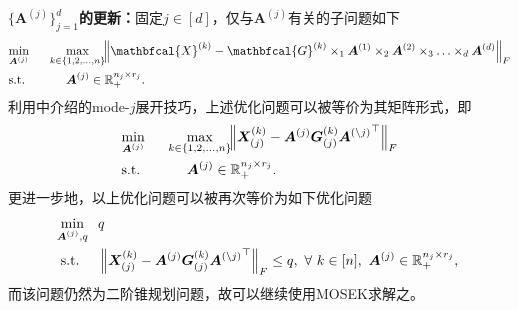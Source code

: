 \textbf{$\{\boldsymbol{A}^{(j)}\}_{j=1}^{d}$的更新：}固定$j\in[d]$，仅与$\boldsymbol{A}^{(j)}$有关的子问题如下
\begin{equation*}
\begin{aligned}
    &\underset{\boldsymbol{A}^{(j)}}{\min}\qquad&& \underset{\mathclap{k\in\{1,2,\ldots,n\}}}{\max}\quad \left\|\mathbfcal{X}^{(k)}-\mathbfcal{G}^{(k)} \times_{1} \boldsymbol{A}^{(1)} \times_{2} \boldsymbol{A}^{(2)}\times_{3}\ldots \times_{d} \boldsymbol{A}^{(d)}\right\|_{F} \\ &\text{s.t. }&& \boldsymbol{A}^{(j)}\in \mathbb{R}_{+}^{n_j \times r_j}.
\end{aligned}
\end{equation*}
利用中介绍的mode-$j$展开技巧，上述优化问题可以被等价为其矩阵形式，即
\begin{equation*}
\begin{aligned}
    &\underset{\boldsymbol{A}^{(j)}}{\min}\qquad&& \underset{\mathclap{k\in\{1,2,\ldots,n\}}}{\max}\quad
	\left\|\boldsymbol{X}^{(k)}_{(j)}  - \boldsymbol{A}^{(j)} \boldsymbol{G}^{(k)}_{(j)} {\boldsymbol{A}^{(\setminus j)}}^{\top} \right\|_{F} \\ &\text{s.t. }&& \boldsymbol{A}^{(j)}\in \mathbb{R}_{+}^{n_j \times r_j}.
\end{aligned}
\end{equation*}
更进一步地，以上优化问题可以被再次等价为如下优化问题
\begin{equation*}
\begin{aligned}
&\underset{\mathclap{\boldsymbol{A}^{(j)},q}}{\min} && q \\
&\text{s.t.} && \left\|\boldsymbol{X}^{(k)}_{(j)}- \boldsymbol{A}^{(j)} \boldsymbol{G}^{(k)}_{(j)} {\boldsymbol{A}^{(\setminus j)}}^{\top}\right\|_{F} \leq q,~\forall~ k\in[n],~\boldsymbol{A}^{(j)} \in \mathbb{R}_{+}^{n_j \times r_j},
\end{aligned}
\end{equation*}
而该问题仍然为二阶锥规划问题，故可以继续使用MOSEK求解之。


